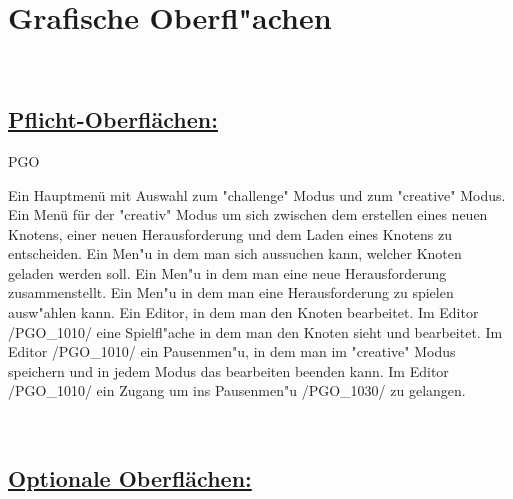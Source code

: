 %
%


%
%
\clearpage


\section{Grafische Oberfl{"a}chen}
\label{NU:GO}~\\

\subsection*{\underline{Pflicht-Oberflächen:}}

\begin{ids}{\gls{PGO}}

	\id[0010] Ein Hauptmenü mit Auswahl zum "challenge" Modus und zum "creative" Modus.
	\id[0020] Ein Menü für der "creativ" Modus um sich zwischen dem erstellen eines neuen Knotens, einer neuen Herausforderung und dem Laden eines Knotens zu entscheiden.
	\id[0030] Ein Men{"u} in dem man sich aussuchen kann, welcher Knoten geladen werden soll.
	\id[0040] Ein Men{"u} in dem man eine neue Herausforderung zusammenstellt.
	\id[0050] Ein Men{"u} in dem man eine Herausforderung zu spielen ausw{"a}hlen kann.
	\id[1010] Ein Editor, in dem man den Knoten bearbeitet.
	\id[1020] Im Editor /PGO\_1010/ eine Spielfl{"a}che in dem man den Knoten sieht und bearbeitet.
	\id[1030] Im Editor /PGO\_1010/ ein Pausenmen{"u}, in dem man im "creative" Modus speichern und in jedem Modus das bearbeiten beenden kann.
	\id[1040] Im Editor /PGO\_1010/ ein Zugang um ins Pausenmen{"u} /PGO\_1030/ zu gelangen.

\end{ids}


~\\


\subsection*{\underline{Optionale Oberflächen:}}


